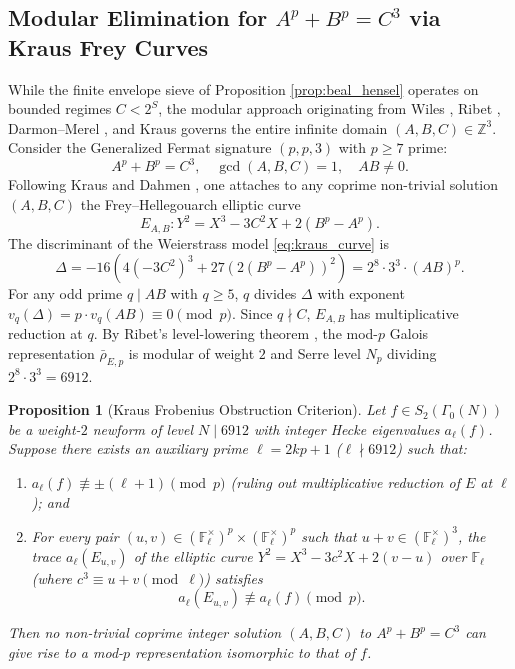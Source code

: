 \documentclass[11pt, a4paper]{amsart}
\newtheorem{proposition}[theorem]{Proposition}
\theoremstyle{definition}
\newcommand{\Z}{\mathbb{Z}}
\newcommand{\F}{\mathbb{F}}
\begin{document}
\subsection{Modular Elimination for $A^p + B^p = C^3$ via Kraus Frey Curves}
While the finite envelope sieve of Proposition \ref{prop:beal_hensel} operates on bounded regimes $C < 2^S$, the modular approach originating from Wiles \cite{Wiles1995}, Ribet \cite{Ribet1990}, Darmon--Merel \cite{DarmonMerel1997}, and Kraus \cite{Kraus1998} governs the entire infinite domain $(A, B, C) \in \Z^3$. Consider the Generalized Fermat signature $(p, p, 3)$ with $p \ge 7$ prime:
\begin{equation}\label{eq:beal_pp3}
A^p + B^p = C^3, \quad \gcd(A, B, C) = 1, \quad AB \ne 0.
\end{equation}
Following Kraus \cite{Kraus1998} and Dahmen \cite{Dahmen2008}, one attaches to any coprime non-trivial solution $(A, B, C)$ the Frey--Hellegouarch elliptic curve
\begin{equation}\label{eq:kraus_curve}
E_{A,B}: Y^2 = X^3 - 3 C^2 X + 2(B^p - A^p).
\end{equation}
The discriminant of the Weierstrass model \eqref{eq:kraus_curve} is
\begin{equation}\label{eq:kraus_disc}
\Delta = -16\left( 4(-3C^2)^3 + 27(2(B^p - A^p))^2 \right) = 2^8 \cdot 3^3 \cdot (AB)^p.
\end{equation}
For any odd prime $q \mid AB$ with $q \ge 5$, $q$ divides $\Delta$ with exponent $v_q(\Delta) = p \cdot v_q(AB) \equiv 0 \pmod p$. Since $q \nmid C$, $E_{A,B}$ has multiplicative reduction at $q$. By Ribet's level-lowering theorem \cite{Ribet1990}, the mod-$p$ Galois representation $\bar{\rho}_{E,p}$ is modular of weight $2$ and Serre level $N_p$ dividing $2^8 \cdot 3^3 = 6912$.

\begin{proposition}[Kraus Frobenius Obstruction Criterion]\label{prop:kraus_criterion}
Let $f \in S_2(\Gamma_0(N))$ be a weight-$2$ newform of level $N \mid 6912$ with integer Hecke eigenvalues $a_\ell(f)$. Suppose there exists an auxiliary prime $\ell = 2kp + 1$ ($\ell \nmid 6912$) such that:
\begin{enumerate}
    \item $a_\ell(f) \not\equiv \pm (\ell + 1) \pmod p$ (ruling out multiplicative reduction of $E$ at $\ell$); and
    \item For every pair $(u, v) \in (\F_\ell^\times)^p \times (\F_\ell^\times)^p$ such that $u + v \in (\F_\ell^\times)^3$, the trace $a_\ell(E_{u,v})$ of the elliptic curve $Y^2 = X^3 - 3c^2 X + 2(v - u)$ over $\F_\ell$ (where $c^3 \equiv u + v \pmod \ell$) satisfies
    \begin{equation}\label{eq:kraus_trace_ineq}
    a_\ell(E_{u,v}) \not\equiv a_\ell(f) \pmod p.
    \end{equation}
\end{enumerate}
Then no non-trivial coprime integer solution $(A, B, C)$ to $A^p + B^p = C^3$ can give rise to a mod-$p$ representation isomorphic to that of $f$.
\end{proposition}
\end{document}
